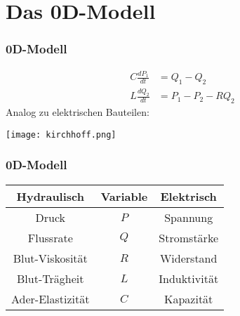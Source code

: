 \section{Das 0D-Modell}

\begin{frame}
\frametitle{0D-Modell}
\begin{equation}
  \begin{aligned}
    C \frac{dP_1}{dt} &= Q_1 - Q_2\\
    L \frac{dQ_2}{dt} &= P_1 - P_2 - RQ_2
  \end{aligned}
\end{equation}
\pause
Analog zu elektrischen Bauteilen:
\begin{center}
  \texttt{[image: kirchhoff.png]}
\end{center}
\end{frame}

\begin{frame}
\frametitle{0D-Modell}
  \begin{center}
  	\begin{tabular}[!htb]{c c c}
  		Hydraulisch	&	Variable	&	Elektrisch\\
  		\hline
  		Druck	&	$P$	&	Spannung\\
  		Flussrate	&	$Q$	&	Stromstärke\\
  		Blut-Viskosität	&	$R$	&	Widerstand\\
  		Blut-Trägheit	&	$L$	&	Induktivität\\
  		Ader-Elastizität	&	$C$	&	Kapazität
  	\end{tabular}
  \end{center}

\end{frame}
